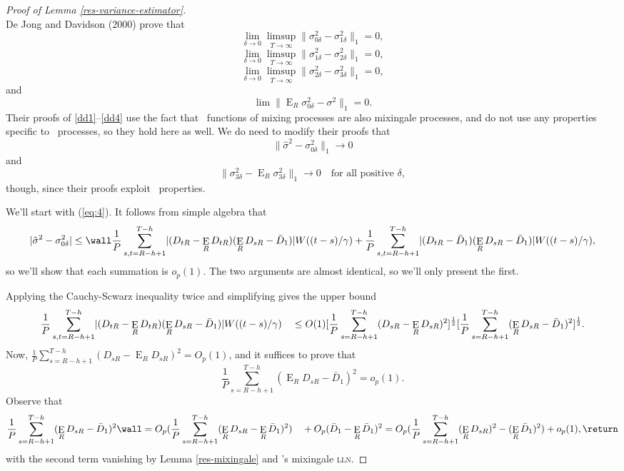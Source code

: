 \documentclass[11pt]{article}
\DeclareMathOperator{\E}{E}
\newcommand{\citepos}[1]{\citeauthor{#1}'s \citeyearpar{#1}}
\newcommand{\oosSum}[2]{\ensuremath{\sum_{#1=R-\h+#2}^{T-\h}}}
\newcommand{\h}{h}
\newcommand{\vWeight}{W((t-s)/\gamma)}
\newcommand{\varianceTermI}{\ensuremath{\sigma_{0\delta}^2}}
\newcommand{\varianceTermII}{\ensuremath{\sigma_{1\delta}^2}}
\newcommand{\varianceTermIII}{\ensuremath{\sigma_{2\delta}^{2}}}
\newcommand{\varianceTermIV}{\ensuremath{\sigma_{3\delta}^{2}}}
\newcommand{\varianceDiffA}{\ensuremath{\frac1{P} \oosSum{s,t}{1}
    \lvert (D_{tR} - \E_R D_{tR})(\E_R D_{sR} - \bar D_1) \rvert
    \vWeight}}
\newcommand{\varianceDiffAi}{\ensuremath{\frac1P \oosSum{s}{1}(\E_R
    D_{sR} - \bar D_1 )^2}}
\newcommand{\varianceDiffAii}{\ensuremath{\frac1P \oosSum{s}{1}
    (D_{sR} - \E_R D_{sR})^2}}
\newcommand{\lln}{\textsc{lln}}
\begin{document}
\begin{proof}[Proof of Lemma \ref{res-variance-estimator}]
\begin{equation*}
\end{equation*}
De Jong and Davidson (2000) prove that
\begin{equation} \label{dd1}
\lim_{\delta\to0} \limsup_{T\to\infty} \lVert \varianceTermI -
\varianceTermII\rVert_1 = 0,
\end{equation}
\begin{equation} \label{dd2}
\lim_{\delta\to0} \limsup_{T\to\infty} \lVert \varianceTermII - \varianceTermIII
\rVert_1 = 0,
\end{equation}
\begin{equation} \label{dd3}
\lim_{\delta\to0} \limsup_{T\to\infty} \lVert \varianceTermIII - \varianceTermIV
\rVert_1 = 0,  
\end{equation}
and
\begin{equation} \label{dd4}
\lim \lVert \E_R \varianceTermI - \sigma^2 \rVert_1 = 0.
\end{equation}
Their proofs of \eqref{dd1}--\eqref{dd4} use the fact that \ned\
functions of mixing processes are also mixingale processes, and do not
use any properties specific to \ned\ processes, so they hold here as
well.  We do need to modify their proofs that
\begin{equation}
  \label{eq:4} \lVert \hat{\sigma}^2 - \varianceTermI \rVert_1 \to 0
\end{equation}
and
\begin{equation}
  \label{eq:5} \lVert \varianceTermIV - \E_R \varianceTermIV \rVert_1
  \to 0 \quad \text{for all positive $\delta$},
\end{equation}
though, since their proofs exploit \ned\ properties.

We'll start with (\ref{eq:4}). It follows from simple algebra that
\[
\lvert \hat\sigma^2 - \varianceTermI \rvert \leq \wall
\varianceDiffA \\ +
\frac1{P} \oosSum{s,t}{1} \lvert (D_{tR} - \bar D_1)(\E_R D_{sR} - \bar D_1) \rvert
\vWeight,
\]
so we'll show that each summation is $o_p(1)$.  The two
arguments are almost identical, so we'll only present the first.

Applying the Cauchy-Scwarz inequality twice and simplifying gives the
upper bound
\[
\varianceDiffA \\ \quad \leq O(1) [\varianceDiffAii]^{\frac12} [\varianceDiffAi]^{\frac12}.
\]
Now,
$\frac1P \oosSum{s}{1}(D_{sR} - \E_R D_{sR})^2 = O_p(1)$, and it suffices to prove
that \[\varianceDiffAi = o_p(1).\]  Observe that
\[
\varianceDiffAi \wall =  O_p(\frac1P \oosSum{s}{1}(\E_{R}D_{sR} -
\E_R\bar D_1)^2) \\
\quad + O_p(\bar D_1 - \E_R\bar D_1)^{2} \\
= O_p(\frac1P \oosSum{s}{1} (\E_RD_{sR})^2 - (\E_R\bar D_1)^2) + o_p(1),    \return
\]
with the second term vanishing by Lemma \ref{res-mixingale} and
\citepos{Dav:93} mixingale \lln.


\end{proof}
\end{document}
